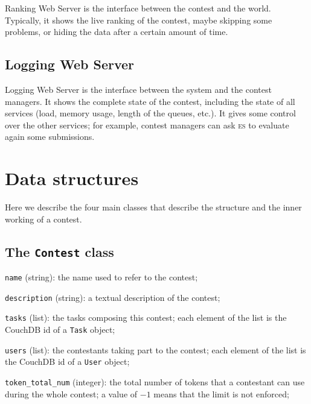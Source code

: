 \documentclass[a4paper,8pt]{amsart}
\newcommand{\ES}{\textsc{es}}
\newenvironment{squishlist}{%
  \begin{list}{\textbullet}%
    { \setlength{\itemsep}{0pt}%
      \setlength{\parsep}{3pt}%
      \setlength{\topsep}{3pt}%
      \setlength{\partopsep}{0pt}%
      \setlength{\leftmargin}{1.5em}%
      \setlength{\labelwidth}{1em}%
      \setlength{\labelsep}{0.5em} }%
}{\end{list}}
\newcommand{\id}[1]{\texttt{#1}}
\begin{document}
\begin{multicols}{2}
  Ranking Web Server is the interface between the contest and the
  world. Typically, it shows the live ranking of the contest, maybe
  skipping some problems, or hiding the data after a certain amount of
  time.

  \subsection{Logging Web Server}

  Logging Web Server is the interface between the system and the
  contest managers. It shows the complete state of the contest,
  including the state of all services (load, memory usage, length of
  the queues, etc.). It gives some control over the other services;
  for example, contest managers can ask \ES{} to evaluate again some
  submissions.

  \section{Data structures}

  Here we describe the four main classes that describe the structure
  and the inner working of a contest.

  \subsection{The \id{Contest} class}

  \begin{squishlist}

  \item \id{name} (string): the name used to refer to the contest;

  \item \id{description} (string): a textual description of the
    contest;

  \item \id{tasks} (list): the tasks composing this contest; each
    element of the list is the CouchDB id of a \id{Task} object;

  \item \id{users} (list): the contestants taking part to the
    contest; each element of the list is the CouchDB id of a
    \id{User} object;

  \item \id{token\_total\_num} (integer): the total number of tokens
    that a contestant can use during the whole contest; a value of
    $-1$ means that the limit is not enforced;


\end{squishlist}
\end{multicols}
\end{document}
